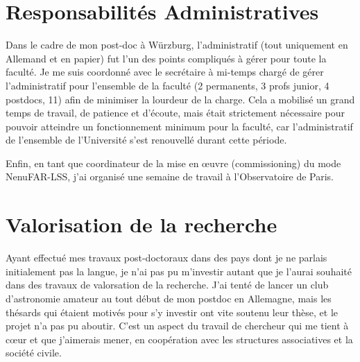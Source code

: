 \section{Responsabilit\'es Administratives}

\pg
Dans le cadre de mon post-doc \`a W\"urzburg, l'administratif (tout uniquement en Allemand et en papier) fut l'un des points compliqu\'es \`a g\'erer pour toute la facult\'e. Je me suis coordonn\'e avec le secr\'etaire \`a mi-temps charg\'e de g\'erer l'administratif pour l'ensemble de la facult\'e (2 permanents, 3 profs junior, 4 postdocs, 11) afin de minimiser la lourdeur de la charge. Cela a mobilis\'e un grand temps de travail, de patience et d'\'ecoute, mais \'etait strictement n\'ecessaire pour pouvoir atteindre un fonctionnement minimum pour la facult\'e, car l'administratif de l'ensemble de l'Universit\'e s'est renouvell\'e durant cette p\'eriode. 

\pg
Enfin, en tant que coordinateur de la mise en {\oe}uvre (commissioning) du mode NenuFAR-LSS, j'ai organis\'e une semaine de travail \`a l'Observatoire de Paris. 



\section{Valorisation de la recherche}

\pg
Ayant effectu\'e mes travaux post-doctoraux dans des pays dont je ne parlais initialement pas la langue, je n'ai pas pu m'investir autant que je l'aurai souhait\'e dans des travaux de valorsation de la recherche. J'ai tent\'e de lancer un club d'astronomie amateur au tout d\'ebut de mon postdoc en Allemagne, mais les th\'esards qui \'etaient motiv\'es pour s'y investir ont vite soutenu leur th\`ese, et le projet n'a pas pu aboutir. C'est un aspect du travail de chercheur qui me tient \`a c{\oe}ur et que j'aimerais mener, en coop\'eration avec les structures associatives et la soci\'et\'e civile.

















